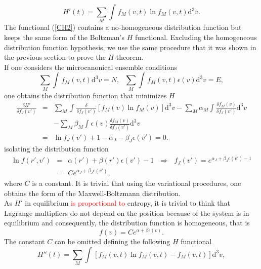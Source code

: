 \documentclass{article}
\begin{document}
\begin{equation}
   H'(t)=\sum_M\int_{}^{} f_M(v,t) \ln f_M(v,t)\mathrm{d}^3v  \label{CH2}.
\end{equation}
The functional (\ref{CH2}) contains a no-homogeneous distribution function but keeps the same form of the Boltzman's $H$ functional. Excluding the homogeneous distribution function hypothesis, we use the same procedure that it was shown in the previous section to prove the $H$-theorem.\\ 
If one considers the microcanonical ensemble conditions 
\begin{equation}
    \sum_M\int_{}^{}f_M(v,t)\mathrm{d}^3v =N, \ \ \ \sum_M\int_{}^{}f_M(v,t)\epsilon(v)\mathrm{d}^3v =E \label{micro},
\end{equation}{}
one obtains the distribution function that minimizes $H$
\begin{eqnarray}
\frac{\delta H'}{\delta f_J(v')}&=&\sum_M\int_{}^{}\frac{\delta}{\delta f_J(v')}\left[f_M(v)\ln f_M(v)  \right]\mathrm{d}^3v -\sum_M\alpha_M\int_{}^{}\frac{\delta f_M(v)}{\delta f_J(v')}\mathrm{d}^3v \nonumber \\
&&-\sum_M\beta_M \int_{}^{}\epsilon(v)\frac{\delta f_M(v)}{\delta f_J(v')}\mathrm{d}^3v \nonumber \\
&=&\ln f_J(v')+1-\alpha_J-\beta_J \epsilon(v')=0.
\end{eqnarray}{}
isolating the distribution function 
\begin{eqnarray}
\ln f(r',v')&=&\alpha(r')+\beta(r') \epsilon(v')-1 \ \ \  \Rightarrow \ \ \ f_J(v')=e^{\alpha_J +\beta_J \epsilon(v')-1} \nonumber \\
&=&Ce^{\alpha_J+\beta_J \epsilon(v') } \label{relacion1},
\end{eqnarray}{}
where $C$ is a constant. It is trivial that using the variational procedures, one obtains the form of the Maxwell-Boltzmann distribution. \\
As $H'$ in equilibrium \textcolor{red}{is proportional to} entropy, it is trivial to think that Lagrange multipliers do not depend on the position because of the system is in equilibrium and consequently, the distribution function is homogeneous, that is
\begin{equation}
    f(v)=Ce^{\alpha+\beta \epsilon(v)}.
\end{equation}{} 
The constant $C$ can be omitted defining the following $H$ functional
\begin{equation}
   H''(t)=\sum_M\int_{}^{} \left[f_M(v,t) \ln f_M(v,t)-f_M(v,t)\right]\mathrm{d}^3v  \label{CH3},
\end{equation}{}
\end{document}
